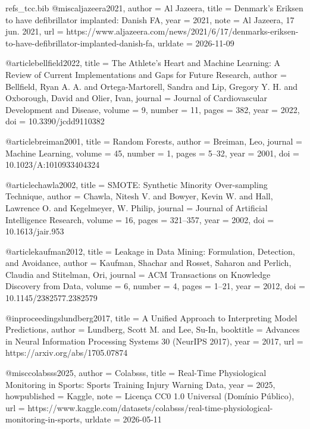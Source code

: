 \begin{filecontents*}[overwrite]{refs_tcc.bib}
@misc{aljazeera2021,
  author  = {{Al Jazeera}},
  title   = {Denmark's {Eriksen} to have defibrillator implanted: {Danish FA}},
  year    = {2021},
  note    = {Al Jazeera, 17 jun. 2021},
  url     = {https://www.aljazeera.com/news/2021/6/17/denmarks-eriksen-to-have-defibrillator-implanted-danish-fa},
  urldate = {2026-11-09}
}

@article{bellfield2022,
  title   = {The Athlete's Heart and Machine Learning: A Review of Current Implementations and Gaps for Future Research},
  author  = {Bellfield, Ryan A. A. and Ortega-Martorell, Sandra and Lip, Gregory Y. H. and Oxborough, David and Olier, Ivan},
  journal = {Journal of Cardiovascular Development and Disease},
  volume  = {9},
  number  = {11},
  pages   = {382},
  year    = {2022},
  doi     = {10.3390/jcdd9110382}
}

@article{breiman2001,
  title   = {Random Forests},
  author  = {Breiman, Leo},
  journal = {Machine Learning},
  volume  = {45},
  number  = {1},
  pages   = {5--32},
  year    = {2001},
  doi     = {10.1023/A:1010933404324}
}

@article{chawla2002,
  title   = {{SMOTE}: Synthetic Minority Over-sampling Technique},
  author  = {Chawla, Nitesh V. and Bowyer, Kevin W. and Hall, Lawrence O. and Kegelmeyer, W. Philip},
  journal = {Journal of Artificial Intelligence Research},
  volume  = {16},
  pages   = {321--357},
  year    = {2002},
  doi     = {10.1613/jair.953}
}

@article{kaufman2012,
  title   = {Leakage in Data Mining: Formulation, Detection, and Avoidance},
  author  = {Kaufman, Shachar and Rosset, Saharon and Perlich, Claudia and Stitelman, Ori},
  journal = {ACM Transactions on Knowledge Discovery from Data},
  volume  = {6},
  number  = {4},
  pages   = {1--21},
  year    = {2012},
  doi     = {10.1145/2382577.2382579}
}

@inproceedings{lundberg2017,
  title     = {A Unified Approach to Interpreting Model Predictions},
  author    = {Lundberg, Scott M. and Lee, Su-In},
  booktitle = {Advances in Neural Information Processing Systems 30 (NeurIPS 2017)},
  year      = {2017},
  url       = {https://arxiv.org/abs/1705.07874}
}

@misc{colabsss2025,
  author       = {{Colabsss}},
  title        = {Real-Time Physiological Monitoring in Sports: Sports Training Injury Warning Data},
  year         = {2025},
  howpublished = {Kaggle},
  note         = {Licen{\c{c}}a CC0 1.0 Universal (Dom{\'i}nio P{\'u}blico)},
  url          = {https://www.kaggle.com/datasets/colabsss/real-time-physiological-monitoring-in-sports},
  urldate      = {2026-05-11}
}


\end{filecontents*}
